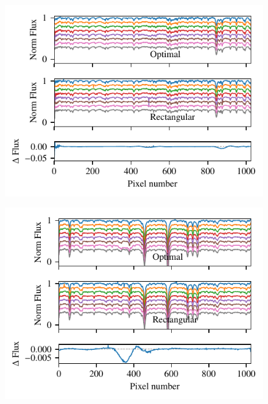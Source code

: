  \begin{figure}
     \centering
     \includegraphics[width=0.7\linewidth]{figures/reduction/bp_plots/extraction_comparision_HD4747-1_chip_4}
     \caption{}
     \label{fig:extractioncomparisionhd4747-1chip4}
 \end{figure}
 \begin{figure}
     \centering
     \includegraphics[width=0.7\linewidth]{figures/reduction/bp_plots/extraction_comparision_HD30501-1_chip_1}
     \caption{}
     \label{fig:extractioncomparisionhd30501-1chip1}
 \end{figure}
 